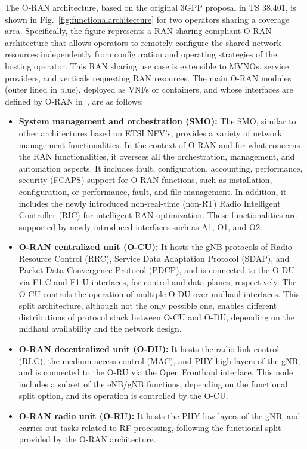 \documentclass[journal]{IEEEtran}
\begin{document}
	The O-RAN architecture, based on the original 3GPP proposal in TS 38.401, is shown in Fig.~\ref{fig:functionalarchitecture} for two operators sharing a coverage area. Specifically, the figure represents a RAN sharing-compliant O-RAN architecture that allows operators to remotely configure the shared network resources independently from configuration and operating strategies of the hosting operator. This RAN sharing use case is extensible to MVNOs, service providers, and verticals requesting RAN resources. The main O-RAN modules (outer lined in blue), deployed as VNFs or containers, and whose interfaces are defined by O-RAN in~\cite{ORANall}, are as follows: 
	\begin{itemize}
		\item \textbf{System management and orchestration (SMO):} The SMO, similar to other architectures based on ETSI NFV's, provides a variety of network management functionalities. In the context of O-RAN and for what concerns the RAN functionalities, it oversees all the orchestration, management, and automation aspects. It includes fault, configuration, accounting, performance, security (FCAPS) support for O-RAN functions, such as installation, configuration, or performance, fault, and file management. In addition, it includes the newly introduced non-real-time (non-RT) Radio Intelligent Controller (RIC) for intelligent RAN optimization. These functionalities are supported by newly introduced interfaces such as A1, O1, and O2.
		\item \textbf{O-RAN centralized unit (O-CU):} It hosts the gNB protocols of Radio Resource Control (RRC), Service Data Adaptation Protocol (SDAP), and Packet Data Convergence Protocol (PDCP), and is connected to the O-DU via F1-C and F1-U interfaces, for control and data planes, respectively. The O-CU controls the operation of multiple O-DU over midhaul interfaces. This split architecture, although not the only possible one, enables different distributions of protocol stack between O-CU and O-DU, depending on the midhaul availability and the network design.
		\item \textbf{O-RAN decentralized unit (O-DU):} It hosts the radio link control (RLC), the medium access control (MAC), and PHY-high layers of the gNB, and is connected to the O-RU via the Open Fronthaul interface. This node includes a subset of the eNB/gNB functions, depending on the functional split option, and its operation is controlled by the O-CU.
		\item \textbf{O-RAN radio unit (O-RU):} It hosts the PHY-low layers of the gNB, and carries out tasks related to RF processing, following the functional split provided by the O-RAN architecture.

\end{itemize}
\end{document}
